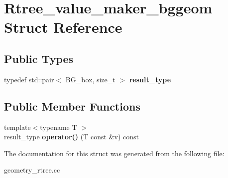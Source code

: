 \hypertarget{structRtree__value__maker__bggeom}{}\section{Rtree\+\_\+value\+\_\+maker\+\_\+bggeom Struct Reference}
\label{structRtree__value__maker__bggeom}
\subsection*{Public Types}
\begin{DoxyCompactItemize}
\item 
\mbox{\label{structRtree__value__maker__bggeom_af6b48d804ecb3f33e8ead74d70b22e9b}} 
typedef std\+::pair$<$ B\+G\+\_\+box, size\+\_\+t $>$ {\bfseries result\+\_\+type}
\end{DoxyCompactItemize}
\subsection*{Public Member Functions}
\begin{DoxyCompactItemize}
\item 
\mbox{\label{structRtree__value__maker__bggeom_ab41baa94092c14708f5d6bd65bb7abc3}} 
{\footnotesize template$<$typename T $>$ }\\result\+\_\+type {\bfseries operator()} (T const \&v) const
\end{DoxyCompactItemize}


The documentation for this struct was generated from the following file\+:\begin{DoxyCompactItemize}
\item 
geometry\+\_\+rtree.\+cc\end{DoxyCompactItemize}
